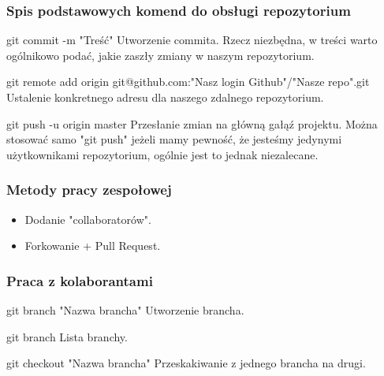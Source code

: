 \documentclass[9pt]{beamer}
\begin{document}
	
		
	\begin{frame}
		\frametitle{Spis podstawowych komend do obsługi repozytorium}

			\begin{block}{git commit -m "Treść"}
				Utworzenie commita. Rzecz niezbędna, w treści warto ogólnikowo podać, jakie zaszły zmiany w naszym repozytorium.
			\end{block}

			\begin{block}{git remote add origin git@github.com:"Nasz login Github"/"Nasze repo".git}
				Ustalenie konkretnego adresu dla naszego zdalnego repozytorium.
			\end{block}	

			\begin{block}{git push -u origin master}
				Przesłanie zmian na główną gałąź projektu. Można stosować samo "git push" jeżeli mamy pewność, że jesteśmy jedynymi użytkownikami repozytorium, ogólnie jest to jednak niezalecane.
			\end{block}	
			
					
						
	\end{frame}



	\begin{frame}
		\frametitle{Metody pracy zespołowej}
		\begin{itemize}
			\item Dodanie "collaboratorów".
			\item Forkowanie + Pull Request.
		\end{itemize}
	\end{frame}


		
	\begin{frame}
		\frametitle{Praca z kolaborantami}

			\begin{block}{git branch "Nazwa brancha"}
				Utworzenie brancha.
			\end{block}

			\begin{block}{git branch}
				Lista branchy.
			\end{block}	

			\begin{block}{git checkout "Nazwa brancha"}
				Przeskakiwanie z jednego brancha na drugi.
			\end{block}	
			
					
						
	\end{frame}
	
\end{document}

